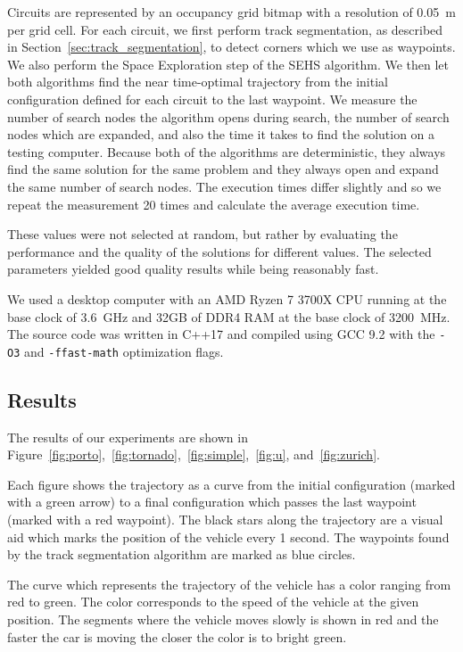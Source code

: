 Circuits are represented by an occupancy grid bitmap with a resolution of \SI{0.05}{\meter} per grid cell. For each circuit, we first perform track segmentation, as described in Section~\ref{sec:track_segmentation}, to detect corners which we use as waypoints. We also perform the Space Exploration step of the SEHS algorithm. We then let both algorithms find the near time-optimal trajectory from the initial configuration defined for each circuit to the last waypoint. We measure the number of search nodes the algorithm opens during search, the number of search nodes which are expanded, and also the time it takes to find the solution on a testing computer. Because both of the algorithms are deterministic, they always find the same solution for the same problem and they always open and expand the same number of search nodes. The execution times differ slightly and so we repeat the measurement 20 times and calculate the average execution time.

These values were not selected at random, but rather by evaluating the performance and the quality of the solutions for different values. The selected parameters yielded good quality results while being reasonably fast.

We used a desktop computer with an AMD Ryzen 7 3700X CPU running at the base clock of \SI{3.6}{\giga\hertz} and \num{32}GB of DDR4 RAM at the base clock of \SI{3200}{\mega\hertz}. The source code was written in C++17 and compiled using GCC 9.2 with the \texttt{-O3} and \texttt{-ffast-math} optimization flags.

\subsection{Results}

The results of our experiments are shown in Figure~\ref{fig:porto},~\ref{fig:tornado},~\ref{fig:simple},~\ref{fig:u}, and~\ref{fig:zurich}.

Each figure shows the trajectory as a curve from the initial configuration (marked with a green arrow) to a final configuration which passes the last waypoint (marked with a red waypoint). The black stars along the trajectory are a visual aid which marks the position of the vehicle every 1 second. The waypoints found by the track segmentation algorithm are marked as blue circles.

The curve which represents the trajectory of the vehicle has a color ranging from red to green. The color corresponds to the speed of the vehicle at the given position. The segments where the vehicle moves slowly is shown in red and the faster the car is moving the closer the color is to bright green.

